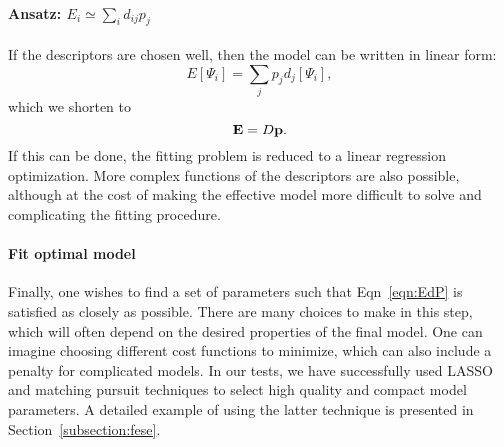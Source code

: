 \paragraph{Ansatz: $E_i \simeq \sum_i  d_{ij} p_j$} 
If the descriptors are chosen well, then the model can be written in linear form:
\begin{equation}
E[\Psi_i] = \sum_j p_j d_j[\Psi_i],	
\end{equation}
which we shorten to 
\begin{equation}
{\bf E} = D{\bf p} .
\label{eqn:EdP}
\end{equation}
If this can be done, the fitting problem is reduced to a linear regression optimization.
More complex functions of the descriptors are also possible, although at the cost of making the effective model more difficult to solve and complicating the fitting procedure.


\paragraph{Fit optimal model}
Finally, one wishes to find a set of parameters such that Eqn~\ref{eqn:EdP} is satisfied as closely as possible. 
There are many choices to make in this step, which will often depend on the desired properties of the final model. 
One can imagine choosing different cost functions to minimize, which can also include a penalty for complicated models. 
In our tests, we have successfully used LASSO \cite{Lasso} and matching pursuit techniques \cite{MP_Zhang1993} to select high quality and compact model parameters. 
A detailed example of using the latter technique is presented in Section~\ref{subsection:fese}.


